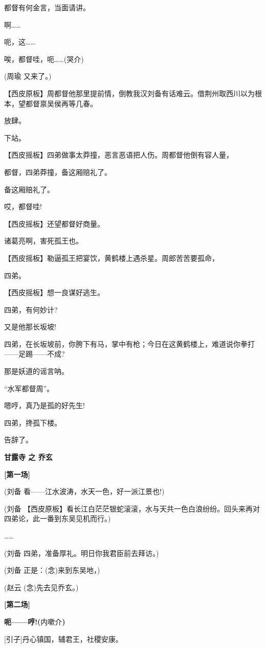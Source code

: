 都督有何金言，当面请讲。

啊\ldots{}\ldots{}

呃，这\ldots{}\ldots{}

唉，都督哇，呃\ldots{}\ldots{}(哭介)

(周瑜 又来了。)

【西皮原板】周都督他那里提前情，倒教我汉刘备有话难云。借荆州取西川以为根本，望都督禀吴侯再等几春。

放肆。

下站。

【西皮摇板】四弟做事太莽撞，恶言恶语把人伤。周都督他倒有容人量，

都督，四弟莽撞，备这厢赔礼了。

备这厢赔礼了。

哎，都督哇!

【西皮摇板】还望都督好商量。

诸葛亮啊，害死孤王也。

【西皮摇板】勒逼孤王把宴饮，黄鹤楼上遇杀星。周郎苦苦要孤命，

四弟。

【西皮摇板】想一良谋好逃生。

四弟，有何妙计?

又是他那长坂坡!

四弟，在长坂坡前，你胯下有马，掌中有枪；今日在这黄鹤楼上，难道说你拳打------足踢------不成?

那是妖道的谣言呐。

``水军都督周''。

嗯哼，真乃是孤的好先生!

四弟，搀孤下楼。

告辞了。

\textbf{甘露寺 之 乔玄}

\textbf{{[}第一场{]}}

(刘备 看------江水波涛，水天一色，好一派江景也!)

(刘备
【西皮原板】看长江白茫茫银蛇滚滚，水与天共一色白浪纷纷。回头来再对四弟论，此一番到东吴见机而行。)

\ldots{}\ldots{}

(刘备 四弟，准备厚礼。明日你我君臣前去拜访。)

(刘备 正是：(念)来到东吴地，)

(赵云 (念)先去见乔玄。)

\textbf{{[}第二场{]}}

\textbf{呃------哼!(}内嗽介\textbf{)}

{[}引子{]}丹心镇国，辅君王，社稷安康。

